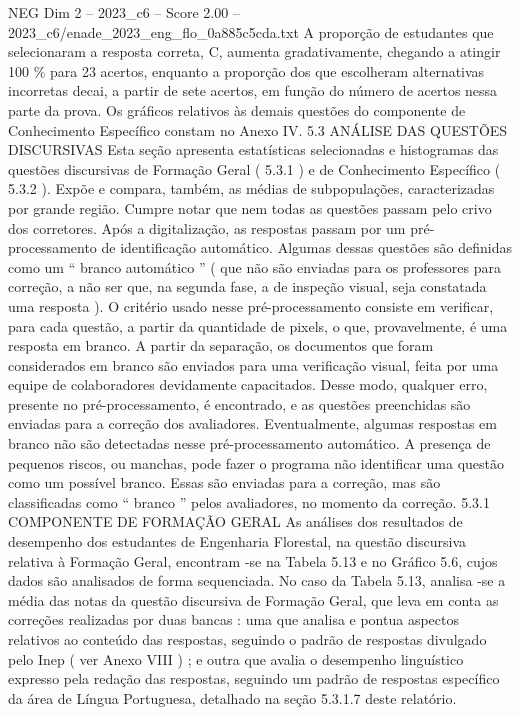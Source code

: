 \begin{textsample}{NEG Dim 2 – 2023\_c6 – Score 2.00 – 2023\_c6/enade\_2023\_eng\_flo\_0a885c5cda.txt}
A proporção de estudantes que selecionaram a resposta correta, C, aumenta gradativamente, chegando a atingir 100 \% para 23 acertos, enquanto a proporção dos que escolheram alternativas incorretas decai, a partir de sete acertos, em função do número de acertos nessa parte da prova.
Os gráficos relativos às demais questões do componente de Conhecimento Específico constam no Anexo IV. 5.3 ANÁLISE DAS QUESTÕES DISCURSIVAS Esta seção apresenta estatísticas selecionadas e histogramas das questões discursivas de Formação Geral ( 5.3.1 ) e de Conhecimento Específico ( 5.3.2 ).
Expõe e compara, também, as médias de subpopulações, caracterizadas por grande região.
Cumpre notar que nem todas as questões passam pelo crivo dos corretores.
Após a digitalização, as respostas passam por um pré-processamento de identificação automático.
Algumas dessas questões são definidas como um “ branco automático ” ( que não são enviadas para os professores para correção, a não ser que, na segunda fase, a de inspeção visual, seja constatada uma resposta ).
O critério usado nesse pré-processamento consiste em verificar, para cada questão, a partir da quantidade de pixels, o que, provavelmente, é uma resposta em branco.
A partir da separação, os documentos que foram considerados em branco são enviados para uma verificação visual, feita por uma equipe de colaboradores devidamente capacitados.
Desse modo, qualquer erro, presente no pré-processamento, é encontrado, e as questões preenchidas são enviadas para a correção dos avaliadores.
Eventualmente, algumas respostas em branco não são detectadas nesse pré-processamento automático.
A presença de pequenos riscos, ou manchas, pode fazer o programa não identificar uma questão como um possível branco.
Essas são enviadas para a correção, mas são classificadas como “ branco ” pelos avaliadores, no momento da correção. 5.3.1 COMPONENTE DE FORMAÇÃO GERAL As análises dos resultados de desempenho dos estudantes de Engenharia Florestal, na questão discursiva relativa à Formação Geral, encontram -se na Tabela 5.13 e no Gráfico 5.6, cujos dados são analisados de forma sequenciada.
No caso da Tabela 5.13, analisa -se a média das notas da questão discursiva de Formação Geral, que leva em conta as correções realizadas por duas bancas : uma que analisa e pontua aspectos relativos ao conteúdo das respostas, seguindo o padrão de respostas divulgado pelo Inep ( ver Anexo VIII ) ; e outra que avalia o desempenho linguístico expresso pela redação das respostas, seguindo um padrão de respostas específico da área de Língua Portuguesa, detalhado na seção 5.3.1.7 deste relatório.

\end{textsample}
